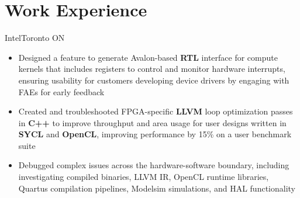 \documentclass{moderncv}
\begin{document}
\makecvtitle
\begin{comment}
\section{Skills}
\begin{minipage}{0.25\textwidth}
    \begin{itemize}
        \item Reinforcement Learning
    \end{itemize}
\end{minipage}
    \begin{minipage}{0.25\textwidth}
    \begin{itemize}
        \item Reinforcement Learning
    \end{itemize}
\end{minipage}
\begin{minipage}{0.25\textwidth}
    \begin{itemize}
        \item Reinforcement Learning
    \end{itemize}
\end{minipage}
\begin{minipage}{0.25\textwidth}
    \begin{itemize}
        \item Reinforcement Learning
    \end{itemize}
\end{minipage}
\end{comment}
\section{Work Experience}

{Intel}{Toronto ON}{}
{\begin{itemize}
    \item Designed a feature to generate Avalon-based \textbf{RTL} interface for compute kernels that includes registers to control and monitor hardware interrupts, ensuring usability for customers developing device drivers by engaging with FAEs for early feedback
    \item Created and troubleshooted FPGA-specific \textbf{LLVM} loop optimization passes in \textbf{C++} to improve throughput and area usage for user designs written in \textbf{SYCL} and \textbf{OpenCL}, improving performance by 15\% on a user benchmark suite
    \item Debugged complex issues across the hardware-software boundary, including investigating compiled binaries, LLVM IR, OpenCL runtime libraries, Quartus compilation pipelines, Modelsim simulations, and HAL functionality
\end{itemize}}
\end{document}
